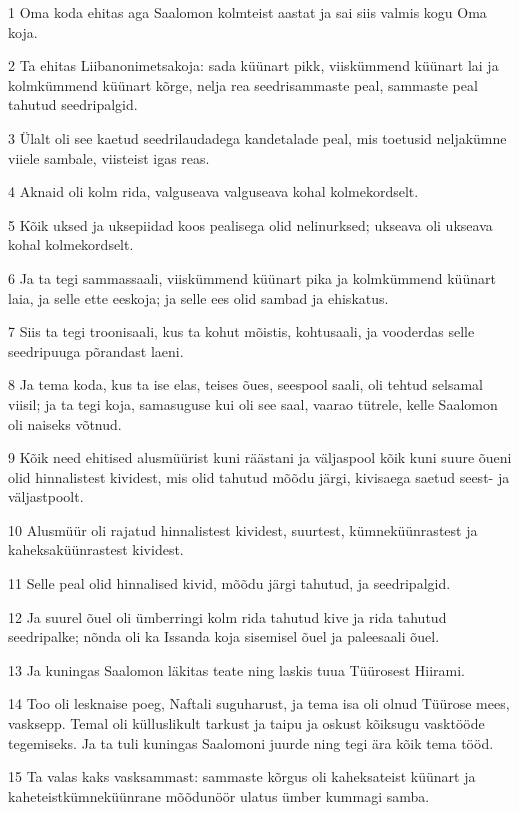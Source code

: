 \par 1 Oma koda ehitas aga Saalomon kolmteist aastat ja sai siis valmis kogu Oma koja.
\par 2 Ta ehitas Liibanonimetsakoja: sada küünart pikk, viiskümmend küünart lai ja kolmkümmend küünart kõrge, nelja rea seedrisammaste peal, sammaste peal tahutud seedripalgid.
\par 3 Ülalt oli see kaetud seedrilaudadega kandetalade peal, mis toetusid neljakümne viiele sambale, viisteist igas reas.
\par 4 Aknaid oli kolm rida, valguseava valguseava kohal kolmekordselt.
\par 5 Kõik uksed ja uksepiidad koos pealisega olid nelinurksed; ukseava oli ukseava kohal kolmekordselt.
\par 6 Ja ta tegi sammassaali, viiskümmend küünart pika ja kolmkümmend küünart laia, ja selle ette eeskoja; ja selle ees olid sambad ja ehiskatus.
\par 7 Siis ta tegi troonisaali, kus ta kohut mõistis, kohtusaali, ja vooderdas selle seedripuuga põrandast laeni.
\par 8 Ja tema koda, kus ta ise elas, teises õues, seespool saali, oli tehtud selsamal viisil; ja ta tegi koja, samasuguse kui oli see saal, vaarao tütrele, kelle Saalomon oli naiseks võtnud.
\par 9 Kõik need ehitised alusmüürist kuni räästani ja väljaspool kõik kuni suure õueni olid hinnalistest kividest, mis olid tahutud mõõdu järgi, kivisaega saetud seest- ja väljastpoolt.
\par 10 Alusmüür oli rajatud hinnalistest kividest, suurtest, kümneküünrastest ja kaheksaküünrastest kividest.
\par 11 Selle peal olid hinnalised kivid, mõõdu järgi tahutud, ja seedripalgid.
\par 12 Ja suurel õuel oli ümberringi kolm rida tahutud kive ja rida tahutud seedripalke; nõnda oli ka Issanda koja sisemisel õuel ja paleesaali õuel.
\par 13 Ja kuningas Saalomon läkitas teate ning laskis tuua Tüürosest Hiirami.
\par 14 Too oli lesknaise poeg, Naftali suguharust, ja tema isa oli olnud Tüürose mees, vasksepp. Temal oli külluslikult tarkust ja taipu ja oskust kõiksugu vasktööde tegemiseks. Ja ta tuli kuningas Saalomoni juurde ning tegi ära kõik tema tööd.
\par 15 Ta valas kaks vasksammast: sammaste kõrgus oli kaheksateist küünart ja kaheteistkümneküünrane mõõdunöör ulatus ümber kummagi samba.
